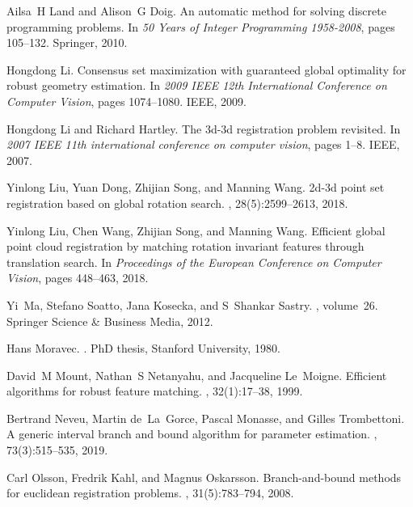 \documentclass[letterpaper, 10 pt, conference]{ieeeconf}  %
\begin{document}
\begin{thebibliography}{10}
	Ailsa~H Land and Alison~G Doig.
	\newblock An automatic method for solving discrete programming problems.
	\newblock In {\em 50 Years of Integer Programming 1958-2008}, pages 105--132.
	  Springer, 2010.
	
	Hongdong Li.
	\newblock Consensus set maximization with guaranteed global optimality for
	  robust geometry estimation.
	\newblock In {\em 2009 IEEE 12th International Conference on Computer Vision},
	  pages 1074--1080. IEEE, 2009.
	
	Hongdong Li and Richard Hartley.
	\newblock The 3d-3d registration problem revisited.
	\newblock In {\em 2007 IEEE 11th international conference on computer vision},
	  pages 1--8. IEEE, 2007.
	
	Yinlong Liu, Yuan Dong, Zhijian Song, and Manning Wang.
	\newblock 2d-3d point set registration based on global rotation search.
	, 28(5):2599--2613, 2018.
	
	Yinlong Liu, Chen Wang, Zhijian Song, and Manning Wang.
	\newblock Efficient global point cloud registration by matching rotation
	  invariant features through translation search.
	\newblock In {\em Proceedings of the European Conference on Computer Vision},
	  pages 448--463, 2018.
	
	Yi~Ma, Stefano Soatto, Jana Kosecka, and S~Shankar Sastry.
	,
	  volume~26.
	\newblock Springer Science \& Business Media, 2012.
	
	Hans Moravec.
	.
	\newblock PhD thesis, Stanford University, 1980.
	
	David~M Mount, Nathan~S Netanyahu, and Jacqueline Le~Moigne.
	\newblock Efficient algorithms for robust feature matching.
	, 32(1):17--38, 1999.
	
	Bertrand Neveu, Martin de~La~Gorce, Pascal Monasse, and Gilles Trombettoni.
	\newblock A generic interval branch and bound algorithm for parameter
	  estimation.
	, 73(3):515--535, 2019.
	
	Carl Olsson, Fredrik Kahl, and Magnus Oskarsson.
	\newblock Branch-and-bound methods for euclidean registration problems.
	,
	  31(5):783--794, 2008.
	

\end{thebibliography}
\end{document}
